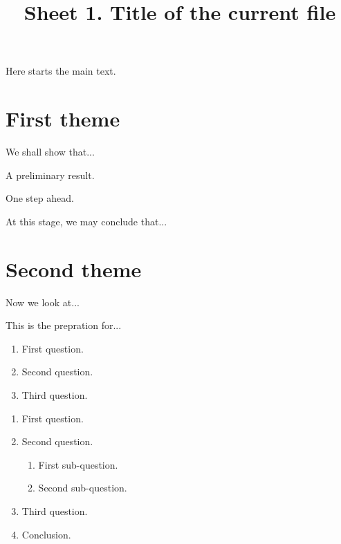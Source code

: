 \documentclass[11pt,
  formal title,
  title in boldface,
]{homework}
\title{%
                    Sheet 1. Title of the current file
}
\author{}
\date{%
}
\begin{document}
Here starts the main text.


\section*{First theme}

We shall show that...

\begin{problem}
    A preliminary result.
\end{problem}

\begin{problem}
    One step ahead.

    \blindtext
\end{problem}

At this stage, we may conclude that...


\section*{Second theme}

Now we look at...

\begin{problem}
    This is the prepration for...
    \begin{enumerate}%
        \item First question.
        \item Second question.
        \item Third question.
        \qedhere
    \end{enumerate}
\end{problem}

\begin{problem}
    \leavevmode %
    \begin{enumerate}[itemsep=.5\baselineskip]
        \item First question.
            \\[.5\baselineskip]
            \blindtext
        \item Second question.
        \begin{enumerate}[itemsep=.3\baselineskip]
            \item First sub-question.
                \\[.3\baselineskip]
                \blindtext
            \item Second sub-question.
                \\[.3\baselineskip]
                \blindtext
        \end{enumerate}
        \item Third question.
            \\[.5\baselineskip]
            \blindtext
        \item Conclusion.
        \qedhere
    \end{enumerate}
\end{problem}
\end{document}
